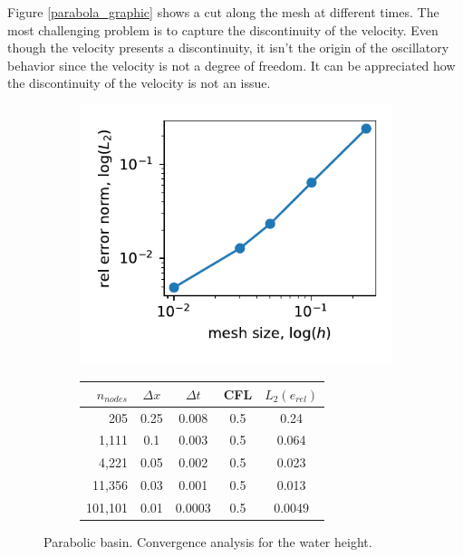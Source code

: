 Figure \ref{parabola_graphic} shows a cut along the mesh at different times. The most challenging problem is to capture the discontinuity of the velocity. Even though the velocity presents a discontinuity, it isn't the origin of the oscillatory behavior since the velocity is not a degree of freedom. It can be appreciated how the discontinuity of the velocity is not an issue.

\begin{figure}
\begin{subfigure}{0.4\textwidth}
    \includegraphics[width=\textwidth]{img/eulerian/par/conv_1.pdf}    
\end{subfigure}
\hfill
\begin{subfigure}{0.58\textwidth}
    \begin{tabular}{>{\small}rcccc} \hline
    $n_{nodes}$ & $\Delta x$ & $\Delta t$ & CFL & $L_2(e_{rel})$ \\ \hline
205 & 0.25 & 0.008 & 0.5 & 0.24 \\
1,111 & 0.1 & 0.003 & 0.5 & 0.064 \\
4,221 & 0.05 & 0.002 & 0.5 & 0.023 \\
11,356 & 0.03 & 0.001 & 0.5 & 0.013 \\
101,101 & 0.01 & 0.0003 & 0.5 & 0.0049 \\
    \hline
    \end{tabular}
\end{subfigure}
\caption{Parabolic basin. Convergence analysis for the water height.}
\label{parabola_convergence}
\end{figure}

